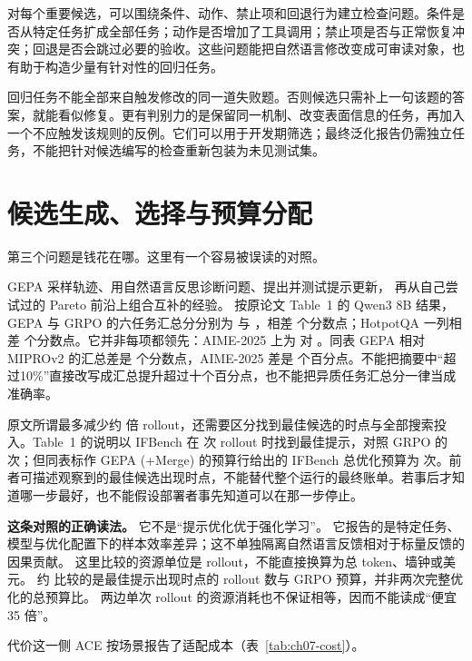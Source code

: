 对每个重要候选，可以围绕条件、动作、禁止项和回退行为建立检查问题。条件是否从特定任务扩成全部任务；动作是否增加了工具调用；禁止项是否与正常恢复冲突；回退是否会跳过必要的验收。这些问题能把自然语言修改变成可审读对象，也有助于构造少量有针对性的回归任务。

回归任务不能全部来自触发修改的同一道失败题。否则候选只需补上一句该题的答案，就能看似修复。更有判别力的是保留同一机制、改变表面信息的任务，再加入一个不应触发该规则的反例。它们可以用于开发期筛选；最终泛化报告仍需独立任务，不能把针对候选编写的检查重新包装为未见测试集。


\section{候选生成、选择与预算分配}
\label{sec:ch07-budget}

第三个问题是钱花在哪。这里有一个容易被误读的对照。

GEPA 采样轨迹、用自然语言反思诊断问题、提出并测试提示更新，
再从自己尝试过的 Pareto 前沿上组合互补的经验\cite{gepa-2507}。
按原论文 Table~1 的 Qwen3 8B 结果，GEPA 与 GRPO 的六任务汇总分分别为  与 ，相差  个分数点；HotpotQA 一列相差  个分数点。它并非每项都领先：AIME-2025 上为  对 \cite{gepa-2507}。同表 GEPA 相对 MIPROv2 的汇总差是  个分数点，AIME-2025 差是  个百分点。不能把摘要中“超过10\%”直接改写成汇总提升超过十个百分点，也不能把异质任务汇总分一律当成准确率。

原文所谓最多减少约  倍 rollout，还需要区分找到最佳候选的时点与全部搜索投入。Table~1 的说明以 IFBench 在  次 rollout 时找到最佳提示，对照 GRPO 的  次；但同表标作 GEPA (+Merge) 的预算行给出的 IFBench 总优化预算为  次\cite{gepa-2507}。前者可描述观察到的最佳候选出现时点，不能替代整个运行的最终账单。若事后才知道哪一步最好，也不能假设部署者事先知道可以在那一步停止。

\begin{principlebox}
\textbf{这条对照的正确读法。}
它不是``提示优化优于强化学习''。
它报告的是特定任务、模型与优化配置下的样本效率差异；这不单独隔离自然语言反馈相对于标量反馈的因果贡献。
这里比较的资源单位是 rollout，不能直接换算为总 token、墙钟或美元。
约  比较的是最佳提示出现时点的 rollout 数与 GRPO 预算，并非两次完整优化的总预算比。
两边单次 rollout 的资源消耗也不保证相等，因而不能读成``便宜 35 倍''。
\end{principlebox}

代价这一侧 ACE 按场景报告了适配成本（表~\ref{tab:ch07-cost}）。

